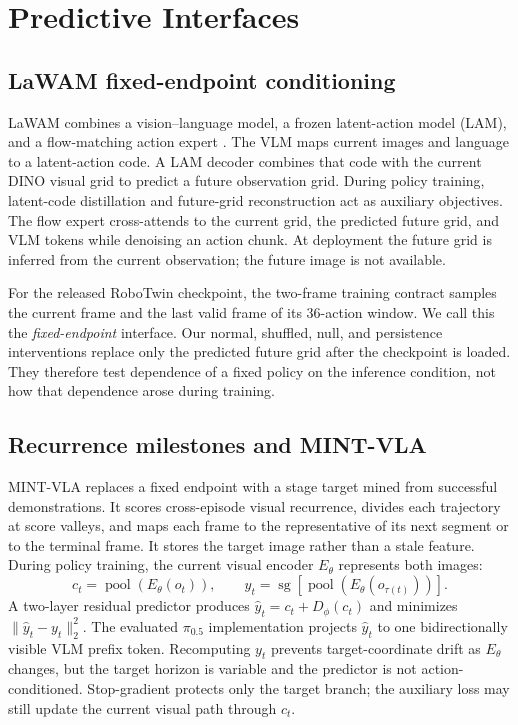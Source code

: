 \section{Predictive Interfaces}\label{sec:method}

\subsection{LaWAM fixed-endpoint conditioning}
LaWAM combines a vision--language model, a frozen latent-action model (LAM),
and a flow-matching action expert \citep{lawam2026}.  The VLM maps current
images and language to a latent-action code.  A LAM decoder combines that code
with the current DINO visual grid to predict a future observation grid.  During
policy training, latent-code distillation and future-grid reconstruction act as
auxiliary objectives.  The flow expert cross-attends to the current grid, the
predicted future grid, and VLM tokens while denoising an action chunk.  At
deployment the future grid is inferred from the current observation; the
future image is not available.

For the released RoboTwin checkpoint, the two-frame training contract samples
the current frame and the last valid frame of its 36-action window.  We call
this the \emph{fixed-endpoint} interface.  Our normal, shuffled, null, and
persistence interventions replace only the predicted future grid after the
checkpoint is loaded.  They therefore test dependence of a fixed policy on the
inference condition, not how that dependence arose during training.

\subsection{Recurrence milestones and MINT-VLA}
MINT-VLA replaces a fixed endpoint with a stage target mined from successful
demonstrations.  It scores cross-episode visual recurrence, divides each
trajectory at score valleys, and maps each frame to the representative of its
next segment or to the terminal frame.  It stores the target image rather than
a stale feature.  During policy training, the current visual encoder
$E_\theta$ represents both images:
\begin{equation}
 c_t=\operatorname{pool}(E_\theta(o_t)),\qquad
 y_t=\operatorname{sg}[\operatorname{pool}(E_\theta(o_{\tau(t)}))].
\end{equation}
A two-layer residual predictor produces
$\hat y_t=c_t+D_\phi(c_t)$ and minimizes
$\|\hat y_t-y_t\|_2^2$.  The evaluated $\pi_{0.5}$ implementation projects
$\hat y_t$ to one bidirectionally visible VLM prefix token.  Recomputing
$y_t$ prevents target-coordinate drift as $E_\theta$ changes, but the target
horizon is variable and the predictor is not action-conditioned.  Stop-gradient
protects only the target branch; the auxiliary loss may still update the
current visual path through $c_t$.

